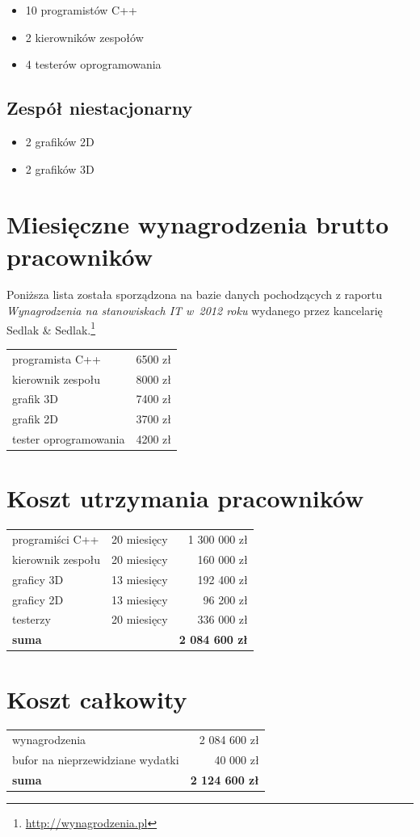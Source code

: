\documentclass{mwrep}
\begin{document}
\begin{itemize}
\item 10 programistów C++
\item 2 kierowników zespołów
\item 4 testerów oprogramowania
\end{itemize}

\subsection{Zespół niestacjonarny}

\begin{itemize}
\item 2 grafików 2D
\item 2 grafików 3D
\end{itemize}

\section{Miesięczne wynagrodzenia brutto pracowników}

Poniższa lista została sporządzona na bazie danych pochodzących z raportu \emph{Wynagrodzenia na stanowiskach IT w~2012 roku} wydanego przez kancelarię Sedlak \& Sedlak.\footnote{\url{http://wynagrodzenia.pl}} \\

\begin{tabular}{lr}
programista C++ & 6500 zł \\
kierownik zespołu & 8000 zł \\
grafik 3D & 7400 zł \\
grafik 2D & 3700 zł \\
tester oprogramowania & 4200 zł
\end{tabular}

\section{Koszt utrzymania pracowników}

\begin{tabular}{llr}
programiści C++ & 20 miesięcy & 1 300 000 zł \\
kierownik zespołu & 20 miesięcy & 160 000 zł \\
graficy 3D & 13 miesięcy & 192 400 zł \\
graficy 2D & 13 miesięcy & 96 200 zł \\
testerzy & 20 miesięcy & 336 000 zł \\
\hline
\textbf{suma} && \textbf{2 084 600 zł}
\end{tabular}

\section{Koszt całkowity}

\begin{tabular}{lr}
wynagrodzenia & 2 084 600 zł \\
bufor na nieprzewidziane wydatki & 40 000 zł \\
\hline
\textbf{suma} & \textbf{2 124 600 zł}
\end{tabular}
\end{document}
